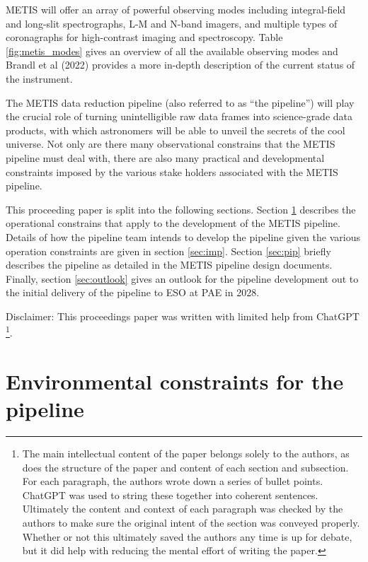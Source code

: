 \documentclass[a4paper]{spie}  %
\begin{document}

METIS will offer an array of powerful observing modes including integral-field and long-slit spectrographs, L-M and N-band imagers, and multiple types of coronagraphs for high-contrast imaging and spectroscopy.
Table \ref{fig:metis_modes} gives an overview of all the available observing modes and Brandl et al (2022) \cite{metis_spie_2022} provides a more in-depth description of the current status of the instrument. 

The METIS data reduction pipeline (also referred to as ``the pipeline'') will play the crucial role of turning unintelligible raw data frames into science-grade data products, with which astronomers will be able to unveil the secrets of the cool universe.
Not only are there many observational constrains that the METIS pipeline must deal with, there are also many practical and developmental constraints imposed by the various stake holders associated with the METIS pipeline. 

This proceeding paper is split into the following sections. 
Section \ref{sec:env} describes the operational constrains that apply to the development of the METIS pipeline. 
Details of how the pipeline team intends to develop the pipeline given the various operation constraints are given in section \ref{sec:imp}. 
Section \ref{sec:pip} briefly describes the pipeline as detailed in the METIS pipeline design documents. 
Finally, section \ref{sec:outlook} gives an outlook for the pipeline development out to the initial delivery of the pipeline to ESO at PAE in 2028.

Disclaimer: This proceedings paper was written with limited help from ChatGPT \footnote{The main intellectual content of the paper belongs solely to the authors, as does the structure of the paper and content of each section and subsection. For each paragraph, the authors wrote down a series of bullet points. ChatGPT was used to string these together into coherent sentences. Ultimately the content and context of each paragraph was checked by the authors to make sure the original intent of the section was conveyed properly. Whether or not this ultimately saved the authors any time is up for debate, but it did help with reducing the mental effort of writing the paper.}.

\section{Environmental constraints for the pipeline}
\label{sec:env}
\end{document}
